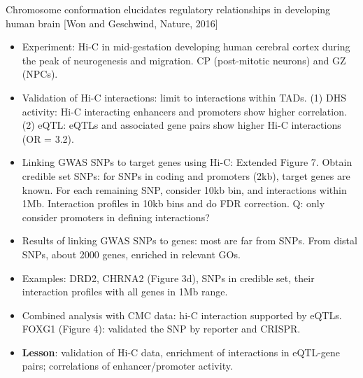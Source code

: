 \documentclass{report}
\begin{document}
Chromosome conformation elucidates regulatory relationships in developing human brain [Won and Geschwind, Nature, 2016]
\begin{itemize}
	\item Experiment: Hi-C in mid-gestation developing human cerebral cortex during the peak of neurogenesis and migration. CP (post-mitotic neurons) and GZ (NPCs).
	
	\item Validation of Hi-C interactions: limit to interactions within TADs. (1) DHS activity: Hi-C interacting enhancers and promoters show higher correlation. (2) eQTL: eQTLs and associated gene pairs show higher Hi-C interactions (OR = 3.2).
	
	\item Linking GWAS SNPs to target genes using Hi-C: Extended Figure 7. Obtain credible set SNPs: for SNPs in coding and promoters (2kb), target genes are known. For each remaining SNP, consider 10kb bin, and interactions within 1Mb. Interaction profiles in 10kb bins and do FDR correction. Q: only consider promoters in defining interactions?
	
	\item Results of linking GWAS SNPs to genes: most are far from SNPs. From distal SNPs, about 2000 genes, enriched in relevant GOs.
	
	\item Examples: DRD2, CHRNA2 (Figure 3d), SNPs in credible set, their interaction profiles with all genes in 1Mb range.
	
	\item Combined analysis with CMC data: hi-C interaction supported by eQTLs. FOXG1 (Figure 4): validated the SNP by reporter and CRISPR.
	
	\item \textbf{Lesson}: validation of Hi-C data, enrichment of interactions in eQTL-gene pairs; correlations of enhancer/promoter activity. 
\end{itemize}
\end{document}
